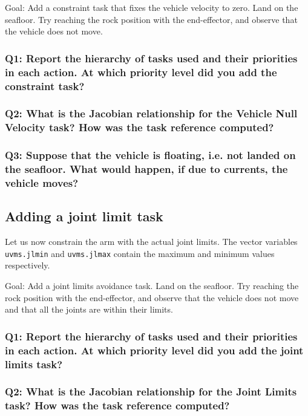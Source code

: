 \documentclass{article}
\begin{document}
Goal: Add a constraint task that fixes the vehicle velocity to zero. Land on the seafloor. Try reaching the rock position with the end-effector, and observe that the vehicle does not move.

\subsubsection{Q1: Report the hierarchy of tasks used and their priorities in each action. At which priority level did you add the constraint task?}

\subsubsection{Q2: What is the Jacobian relationship for the Vehicle Null Velocity task? How was the task reference computed?}

\subsubsection{Q3: Suppose that the vehicle is floating, i.e. not landed on the seafloor. What would happen, if due to currents, the vehicle moves?}


\subsection{Adding a joint limit task}
Let us now constrain the arm with the actual joint limits. The vector variables \texttt{uvms.jlmin} and \texttt{uvms.jlmax} contain the maximum and minimum values respectively.

Goal: Add a joint limits avoidance task. Land on the seafloor. Try reaching the rock position with the end-effector, and observe that the vehicle does not move and that all the joints are within their limits.

\subsubsection{Q1: Report the hierarchy of tasks used and their priorities in each action. At which priority level did you add the joint limits task?}

\subsubsection{Q2: What is the Jacobian relationship for the Joint Limits task? How was the task reference computed?}

\clearpage
\end{document}
